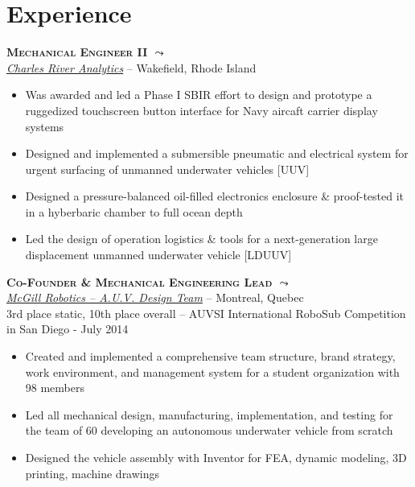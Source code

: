 \documentclass[11pt, letterpaper]{article}
\newcommand{\years}[1]{\marginnote{\footnotesize #1}} %
\begin{document}
  \section*{Experience}

  \begin{samepage}
    \years{9/2014 - Present} \textbf{\scshape Mechanical Engineer II \href{http://www.michaelelliotking.com/blog/first-job}{$\leadsto$}}\\
    \href {http://www.cra.com}{\textit{Charles River Analytics}} -- Wakefield, Rhode Island
    \begin{itemize}
      \item Was awarded and led a Phase I SBIR effort to design and prototype a ruggedized touchscreen button interface for Navy aircaft carrier display systems 
      \item Designed and implemented a submersible pneumatic and electrical system for urgent surfacing of unmanned underwater vehicles [UUV]
      \item Designed a pressure-balanced oil-filled electronics enclosure \& proof-tested it in a hyberbaric chamber to full ocean depth
      \item Led the design of operation logistics \& tools for a next-generation large displacement unmanned underwater vehicle [LDUUV]
    \end{itemize}
  \end{samepage}

  \begin{samepage}
    \years{8/2013 - 8/2014} \textbf{\scshape Co-Founder \& Mechanical Engineering Lead \href{http://www.michaelelliotking.com/projects/mcgillrobotics}{$\leadsto$}}\\
    \href {http://www.mcgillrobotics.com}{\textit{McGill Robotics -- A.U.V. Design Team}} -- Montreal, Quebec\\
    {\small 3rd place static, 10th place overall -- AUVSI International RoboSub Competition in San Diego - July 2014}
    \begin{itemize}
      \item Created and implemented a comprehensive team structure, brand strategy, work environment, and management system for a student organization with 98 members
      \item Led all mechanical design, manufacturing, implementation, and testing for the team of 60 developing an autonomous underwater vehicle from scratch
      \item Designed the vehicle assembly with Inventor for FEA, dynamic modeling, 3D printing, machine drawings 
    \end{itemize}
  \end{samepage}
\end{document}
